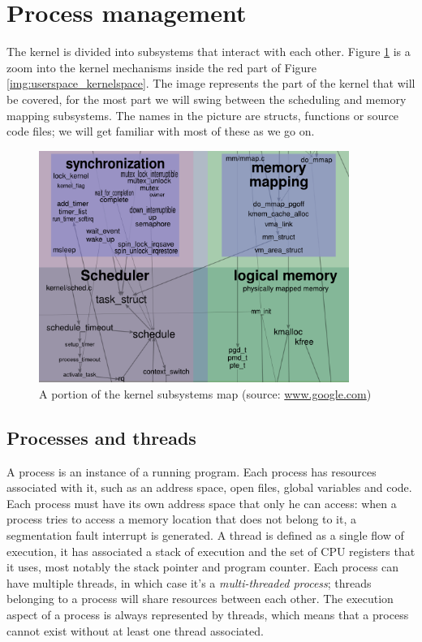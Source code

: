 \section{Process management}
The kernel is divided into subsystems that interact with each other. Figure \ref{img:kernelmap} is a zoom into the kernel mechanisms inside the red part of Figure \ref{img:userspace_kernelspace}. The image represents the part of the kernel that will be covered, for the most part we will swing between the scheduling and memory mapping subsystems. The names in the picture are structs, functions or source code files; we will get familiar with most of these as we go on.

\begin{figure}[t]
\centering
\includegraphics[width=0.9\textwidth]{images/kernelmap.png}
\caption{A portion of the kernel subsystems map (source: \url{www.google.com})}
\label{img:kernelmap}
\end{figure}

\subsection{Processes and threads}
\label{sec:proc_threads}
A process is an instance of a running program. Each process has resources associated with it, such as an address space, open files, global variables and code. Each process must have its own address space that only he can access: when a process tries to access a memory location that does not belong to it, a segmentation fault interrupt is generated. A thread is defined as a single flow of execution, it has associated a stack of execution and the set of CPU registers that it uses, most notably the stack pointer and program counter. Each process can have multiple threads, in which case it's a \textit{multi-threaded process}; threads belonging to a process will share resources between each other. The execution aspect of a process is always represented by threads, which means that a process cannot exist without at least one thread associated.

